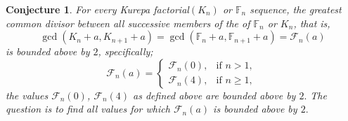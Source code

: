 \documentclass[pdflatex,sn-mathphys-num]{sn-jnl}%
\newtheorem{conjecture}{Conjecture}
\theoremstyle{thmstyleone}%
\theoremstyle{thmstyletwo}%
\theoremstyle{thmstylethree}%
\begin{document}
\begin{conjecture}\label{ATTA}
 For every Kurepa factorial$(K_n)$ or $\mathbb{F}_{n}$ sequence, the greatest common divisor between all successive members of the of $\mathbb{F}_{n}$ or $K_n$, that is,
 $$\gcd(K_n +a,  K_{n+1}+a)=\gcd(\mathbb{F}_n +a,  \mathbb{F}_{n+1}+a)=\mathcal{F}_n(a) $$
 is bounded above by $2$, specifically;
 \begin{equation*}\mathcal{F}_n(a)=
\begin{cases}
	\text{$\mathcal{F}_n(0)$},    & \text{if $n>1$, }\\
	\text{$\mathcal{F}_n(4)$},  & \text{if $n\geq 1$, }
\end{cases}
 \end{equation*}
 the values $\mathcal{F}_n(0)$, $\mathcal{F}_n(4)$ as defined above are bounded above by $2.$
 The question is to find all values for which $\mathcal{F}_n(a)$ is bounded above by $2.$
\end{conjecture}










    
\end{document}
